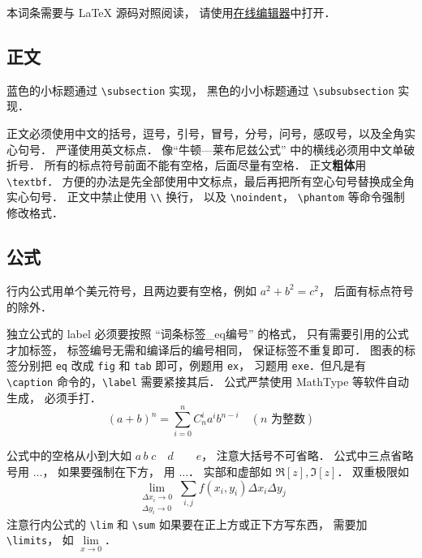 

本词条需要与 LaTeX 源码对照阅读， 请使用\href{http://wuli.wiki/editor}{在线编辑器}中打开．

\subsection{正文}
蓝色的小标题通过 \lstinline|\subsection| 实现， 黑色的小小标题通过 \lstinline|\subsubsection| 实现．

正文必须使用中文的括号，逗号，引号，冒号，分号，问号，感叹号，以及全角实心句号． 严谨使用英文标点． 像“牛顿—莱布尼兹公式” 中的横线必须用中文单破折号． 所有的标点符号前面不能有空格，后面尽量有空格． 正文\textbf{粗体}用 \lstinline|\textbf|． 方便的办法是先全部使用中文标点，最后再把所有空心句号替换成全角实心句号． 正文中禁止使用 \lstinline|\\| 换行， 以及 \lstinline|\noindent|， \lstinline|\phantom| 等命令强制修改格式．

\subsection{公式}
行内公式用单个美元符号，且两边要有空格，例如 $a^2+b^2=c^2$， 后面有标点符号的除外．

独立公式的 label 必须要按照 “词条标签\_eq编号” 的格式， 只有需要引用的公式才加标签， 标签编号无需和编译后的编号相同， 保证标签不重复即可． 图表的标签分别把 \lstinline|eq| 改成 \lstinline|fig| 和 \lstinline|tab| 即可，例题用 \lstinline|ex|， 习题用 \lstinline|exe|．但凡是有 \lstinline|\caption| 命令的，\lstinline|\label| 需要紧接其后． 公式严禁使用 MathType 等软件自动生成， 必须手打．
\begin{equation}\label{Sample_eq1}
(a+b)^n = \sum_{i=0}^n C_n^i a^i b^{n-i} \quad (\text{$n$ 为整数})
\end{equation}

公式中的空格从小到大如 $a\, b\; c\quad d\qquad e$， 注意大括号不可省略． 公式中三点省略号用 $\dots$， 如果要强制在下方， 用 $\ldots$． 实部和虚部如 $\Re[z], \Im[z]$． 双重极限如
\begin{equation}
\lim_{\substack{\Delta x_i\to 0\\ \Delta y_i\to 0}} \sum_{i, j} f(x_i,y_i) \Delta x_i \Delta y_j
\end{equation}
注意行内公式的 \lstinline|\lim| 和 \lstinline|\sum| 如果要在正上方或正下方写东西， 需要加 \lstinline|\limits|， 如 $\lim\limits_{x\to 0}$．

